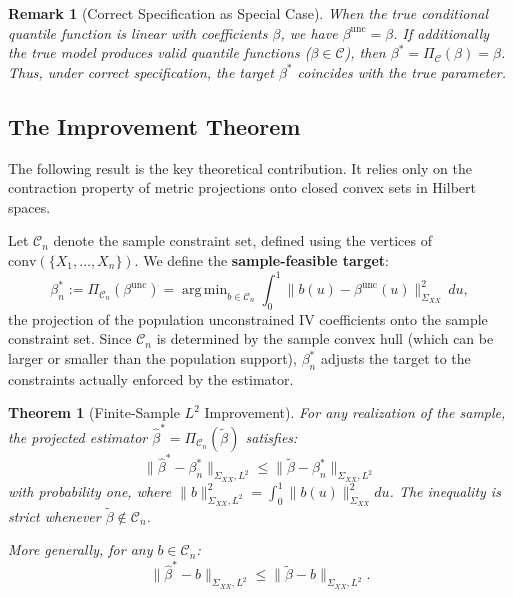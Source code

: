 \documentclass[12pt]{article}
\DeclareMathOperator*{\argmin}{arg\,min}
\newtheorem{theorem}{Theorem}
\newtheorem{remark}{Remark}
\begin{document}
\begin{remark}[Correct Specification as Special Case]
When the true conditional quantile function is linear with coefficients $\beta$, we have $\beta^{\text{unc}} = \beta$. If additionally the true model produces valid quantile functions ($\beta \in \mathcal{C}$), then $\beta^* = \Pi_{\mathcal{C}}(\beta) = \beta$. Thus, under correct specification, the target $\beta^*$ coincides with the true parameter.
\end{remark}

\subsection{The Improvement Theorem}

The following result is the key theoretical contribution. It relies only on the contraction property of metric projections onto closed convex sets in Hilbert spaces.

Let $\mathcal{C}_n$ denote the sample constraint set, defined using the vertices of $\text{conv}(\{X_1, \dots, X_n\})$. We define the \textbf{sample-feasible target}:
\begin{equation}\label{eq:sample-target}
\beta^*_n := \Pi_{\mathcal{C}_n}(\beta^{\text{unc}}) = \argmin_{b \in \mathcal{C}_n} \int_0^1 \|b(u) - \beta^{\text{unc}}(u)\|_{\Sigma_{XX}}^2 \, du,
\end{equation}
the projection of the population unconstrained IV coefficients onto the sample constraint set. Since $\mathcal{C}_n$ is determined by the sample convex hull (which can be larger or smaller than the population support), $\beta^*_n$ adjusts the target to the constraints actually enforced by the estimator.

\begin{theorem}[Finite-Sample $L^2$ Improvement]\label{thm:improvement}
For any realization of the sample, the projected estimator $\hat{\beta}^* = \Pi_{\mathcal{C}_n}(\tilde{\beta})$ satisfies:
\begin{equation}
\|\hat{\beta}^{*} - \beta^*_n\|_{\Sigma_{XX}, L^2} \leq \|\tilde{\beta} - \beta^*_n\|_{\Sigma_{XX}, L^2}
\end{equation}
with probability one, where $\|b\|_{\Sigma_{XX}, L^2}^2 = \int_0^1 \|b(u)\|_{\Sigma_{XX}}^2 du$. The inequality is strict whenever $\tilde{\beta} \notin \mathcal{C}_n$.

More generally, for any $b \in \mathcal{C}_n$:
\begin{equation}\label{eq:oracle-ineq}
\|\hat{\beta}^* - b\|_{\Sigma_{XX}, L^2} \leq \|\tilde{\beta} - b\|_{\Sigma_{XX}, L^2}.
\end{equation}
\end{theorem}
\end{document}

